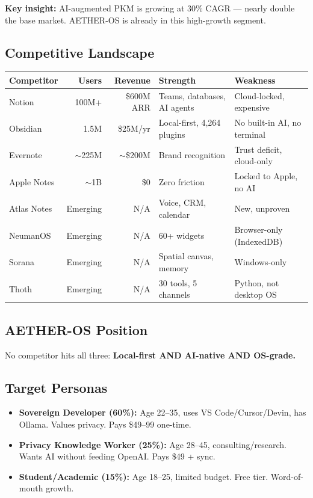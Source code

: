 \documentclass[11pt,a4paper]{article}
\begin{document}
\textbf{Key insight:} AI-augmented PKM is growing at 30\% CAGR --- nearly double the base market. AETHER-OS is already in this high-growth segment.

\subsection{Competitive Landscape}

\begin{table}[h]\centering\small
\begin{tabularx}{\textwidth}{XrrXX}
\toprule
\textbf{Competitor} & \textbf{Users} & \textbf{Revenue} & \textbf{Strength} & \textbf{Weakness} \\
\midrule
Notion & 100M+ & \$600M ARR & Teams, databases, AI agents & Cloud-locked, expensive \\
Obsidian & 1.5M & \$25M/yr & Local-first, 4,264 plugins & No built-in AI, no terminal \\
Evernote & $\sim$225M & $\sim$\$200M & Brand recognition & Trust deficit, cloud-only \\
Apple Notes & $\sim$1B & \$0 & Zero friction & Locked to Apple, no AI \\
Atlas Notes & Emerging & N/A & Voice, CRM, calendar & New, unproven \\
NeumanOS & Emerging & N/A & 60+ widgets & Browser-only (IndexedDB) \\
Sorana & Emerging & N/A & Spatial canvas, memory & Windows-only \\
Thoth & Emerging & N/A & 30 tools, 5 channels & Python, not desktop OS \\
\bottomrule
\end{tabularx}
\end{table}

\subsection{AETHER-OS Position}

No competitor hits all three: \textbf{Local-first AND AI-native AND OS-grade.}

\subsection{Target Personas}

\begin{itemize}[noitemsep]
  \item \textbf{Sovereign Developer (60\%):} Age 22--35, uses VS Code/Cursor/Devin, has Ollama. Values privacy. Pays \$49--99 one-time.
  \item \textbf{Privacy Knowledge Worker (25\%):} Age 28--45, consulting/research. Wants AI without feeding OpenAI. Pays \$49 + sync.
  \item \textbf{Student/Academic (15\%):} Age 18--25, limited budget. Free tier. Word-of-mouth growth.
\end{itemize}
\end{document}
